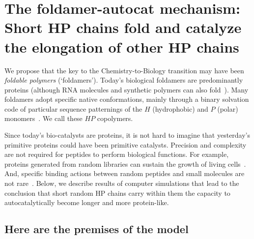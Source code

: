 \documentclass[twocolumn,letterpaper]{revtex4-1}
\begin{document}
\section*{The foldamer-autocat mechanism: Short HP chains fold and catalyze the elongation of 
other 
HP chains}

 We propose that the key to the Chemistry-to-Biology transition may have been \emph{foldable 
polymers} (`foldamers').  Today's biological foldamers are predominantly proteins (although RNA 
molecules 
and synthetic polymers can also fold~\cite{Gellman1998,Lee2005a,Capriotti2008}).  Many foldamers 
adopt specific native conformations, mainly through a binary solvation code of particular sequence 
patternings of the $H$ (hydrophobic) and $P$ (polar) monomers~\cite{Chan1991}.  We call these $HP$ 
copolymers.  

 Since today's bio-catalysts are proteins, it is not hard to imagine that yesterday's primitive 
proteins could have been primitive catalysts.  Precision and complexity are not required for 
peptides to perform biological functions. For example, proteins generated from random libraries 
can 
sustain the growth of living cells~\cite{Fisher2011}.  And, specific binding actions between 
random 
peptides and small molecules are not rare~\cite{Cherny2012}.  Below, we describe results of 
computer simulations that lead to 
the conclusion that short random HP chains carry within them the capacity to autocatalytically 
become longer and more protein-like.  

\subsection*{Here are the premises of the model}
 
\end{document}
